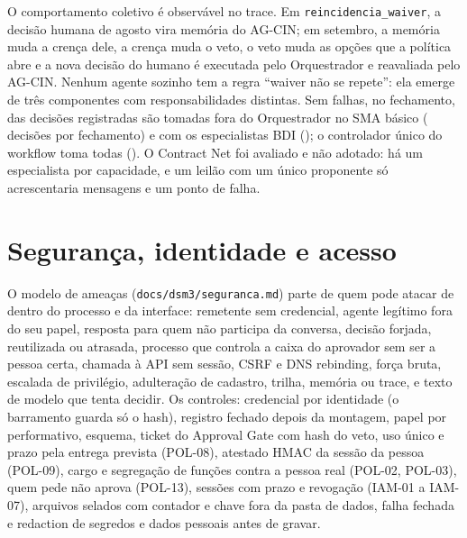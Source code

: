 \documentclass[10pt,a4paper]{article}
\newcommand{\code}[1]{\texttt{#1}}
\begin{document}
O comportamento coletivo é observável no trace. Em \code{reincidencia\_waiver}, a decisão humana de agosto vira memória
do AG-CIN; em setembro, a memória muda a crença dele, a crença muda o veto, o veto muda as opções que a política abre e
a nova decisão do humano é executada pelo Orquestrador e reavaliada pelo AG-CIN. Nenhum agente sozinho tem a regra
\enquote{waiver não se repete}: ela emerge de três componentes com responsabilidades distintas. Sem falhas, no
fechamento,  das decisões registradas são tomadas fora do Orquestrador no SMA
básico ( decisões por fechamento) e  com os
especialistas BDI (); o controlador único do workflow toma todas
(). O Contract Net \parencite{smith1980} foi avaliado e não adotado: há um
especialista por capacidade, e um leilão com um único proponente só acrescentaria mensagens e um ponto de falha.

\section{Segurança, identidade e acesso}
O modelo de ameaças (\code{docs/dsm3/seguranca.md}) parte de quem pode atacar de dentro do processo e da interface:
remetente sem credencial, agente legítimo fora do seu papel, resposta para quem não participa da conversa, decisão
forjada, reutilizada ou atrasada, processo que controla a caixa do aprovador sem ser a pessoa certa, chamada à API sem
sessão, CSRF e DNS rebinding, força bruta, escalada de privilégio, adulteração de cadastro, trilha, memória ou trace, e
texto de modelo que tenta decidir. Os controles: credencial por identidade (o barramento guarda só o hash), registro
fechado depois da montagem, papel por performativo, esquema, ticket do Approval Gate com hash do veto, uso único e
prazo pela entrega prevista (POL-08), atestado HMAC da sessão da pessoa (POL-09), cargo e segregação de funções contra a
pessoa real (POL-02, POL-03), quem pede não aprova (POL-13), sessões com prazo e revogação (IAM-01 a IAM-07), arquivos
selados com contador e chave fora da pasta de dados, falha fechada e redaction de segredos e dados pessoais antes de
gravar.
\end{document}
